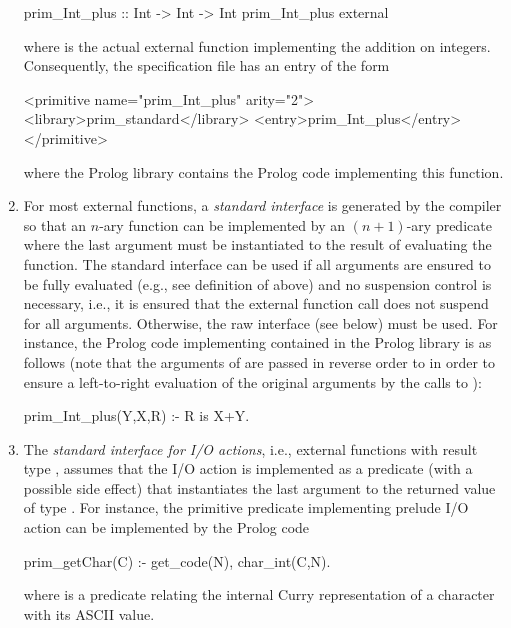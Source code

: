 \begin{enumerate}
\begin{curry}
prim_Int_plus :: Int -> Int -> Int
prim_Int_plus external
\end{curry}
where  is the actual external function implementing
the addition on integers. Consequently, the specification file
 has an entry of the form
\begin{curry}
<primitive name="prim_Int_plus" arity="2">
  <library>prim_standard</library>
  <entry>prim_Int_plus</entry>
</primitive>
\end{curry}
where the Prolog library  contains the Prolog code
implementing this function.

\item
For most external functions, a \emph{standard interface} is
generated by the compiler so that an $n$-ary function can be
implemented by an $(n+1)$-ary predicate where the last argument must
be instantiated to the result of evaluating the function.  The
standard interface can be used if all arguments are ensured to be
fully evaluated (e.g., see definition of \code{(+)} above) and no
suspension control is necessary, i.e., it is ensured that the
external function call does not suspend for all arguments.
Otherwise, the raw interface (see below) must be used.  For
instance, the Prolog code implementing 
contained in the Prolog library  is as
follows (note that the arguments of \code{(+)} are passed in reverse
order to  in order to ensure a left-to-right
evaluation of the original arguments by the calls to \code{(\$\#)}):
\begin{curry}
prim_Int_plus(Y,X,R) :- R is X+Y.
\end{curry}

\item
The \emph{standard interface for I/O actions}, i.e., external functions
with result type , assumes that the I/O action
is implemented as a predicate (with a possible side effect)
that instantiates the last argument to the returned value of type .
For instance, the primitive predicate 
implementing prelude I/O action 
can be implemented by the Prolog code
\begin{curry}
prim_getChar(C) :- get_code(N), char_int(C,N).
\end{curry}
where  is a predicate relating the internal
Curry representation of a character with its ASCII value.


\end{enumerate}
